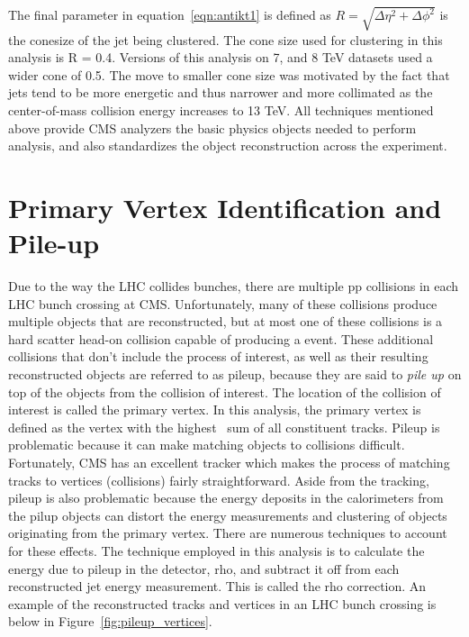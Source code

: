 The final parameter in equation~\ref{eqn:antikt1} is defined as $R = \sqrt{\Delta\eta^{2}+\Delta\phi^{2}}$ is the conesize of the jet being clustered.
The cone size used for clustering in this analysis is R = 0.4. Versions of this analysis on 7, and 8 TeV datasets used a wider cone of 0.5. The move to smaller cone size
was motivated by the fact that jets tend to be more energetic and thus narrower and more collimated as the center-of-mass collision energy increases to 13 TeV. All techniques
mentioned above provide CMS analyzers the basic physics objects needed to perform analysis, and also standardizes the object reconstruction across the experiment. 

\section{Primary Vertex Identification and Pile-up}
Due to the way the LHC collides bunches, there are multiple pp collisions in each LHC bunch crossing at CMS. Unfortunately, many of these collisions produce
multiple objects that are reconstructed, but at most one of these collisions is a hard scatter head-on collision capable of producing a \tth event.
These additional collisions that don't include the process of interest, as well as their resulting reconstructed objects are referred to as pileup, because
they are said to \emph{pile up} on top of the objects from the collision of interest.
The location of the collision of interest is called the primary vertex.
In this analysis, the primary vertex is defined as the vertex with the highest \pt~sum of all constituent tracks.  
Pileup is problematic because it can make matching objects to collisions difficult. Fortunately,
CMS has an excellent tracker which makes the process of matching tracks to vertices (collisions) fairly straightforward. Aside from the tracking, pileup is also
problematic because the energy deposits in the calorimeters from the pilup objects can distort the energy measurements and clustering of objects originating from
the primary vertex. There are numerous techniques to account for these effects. The technique employed in this analysis is to calculate the energy
due to pileup in the detector, rho, and subtract it off from each reconstructed jet energy measurement. This is called the rho correction.  
An example of the reconstructed tracks and vertices in an
LHC bunch crossing is below in Figure~\ref{fig:pileup_vertices}.

